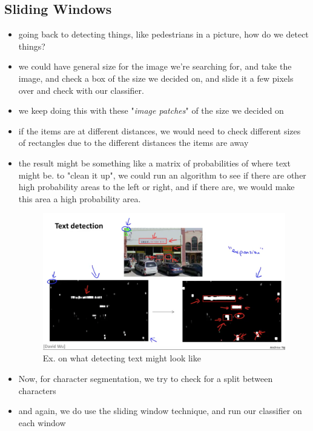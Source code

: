\documentclass[]{article}
\begin{document}
	\subsection{Sliding Windows}
		\begin{itemize}
			\item going back to detecting things, like pedestrians in a picture, how do we detect things?
			\item we could have general size for the image we're searching for, and take the image, and check a box of the size we decided on, and slide it a few pixels over and check with our classifier.
			\item we keep doing this with these "\emph{image patches}" of the size we decided on
			\item if the items are at different distances, we would need to check different sizes of rectangles due to the different distances the items are away
			\item the result might be something like a matrix of probabilities of where text might be. to "clean it up", we could run an algorithm to see if there are other high probability areas to the left or right, and if there are, we would make this area a high probability area.
			\begin{figure}[ht!]
				\includegraphics[width= 1.5\textwidth,center]{Text_Detect_Ex.png}
				\caption{Ex. on what detecting text might look like}
			\end{figure}
			\item Now, for character segmentation, we try to check for a split between characters
			\item and again, we do use the sliding window technique, and run our classifier on each window
			
		\end{itemize}
	
\end{document}
